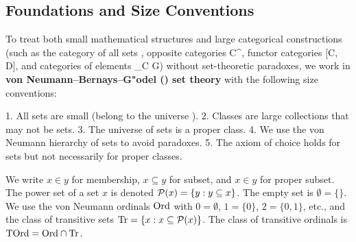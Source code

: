\documentclass[10pt,a4paper]{article}
\begin{document}
\subsection{Foundations and Size Conventions}\label{sec:foundations}
To treat both small mathematical structures and large categorical constructions (such as the category of all sets \Set, opposite categories C^\op, functor categories [C, D], and categories of elements \int_C G) without set-theoretic paradoxes, we work in \textbf{von Neumann--Bernays--G"odel () set theory} with the following size conventions:

1. All sets are small (belong to the universe \Set).
2. Classes are large collections that may not be sets.
3. The universe of sets \Set is a proper class.
4. We use the von Neumann hierarchy of sets to avoid paradoxes.
5. The axiom of choice holds for sets but not necessarily for proper classes.

We write $x \in y$ for membership, $x \subseteq y$ for subset, and $x \in y$ for proper subset. The power set of a set $x$ is denoted ${\mathcal{P}}(x) = \{y: y \subseteq x\}$. The empty set is $\emptyset = \{ \}$. We use the von Neumann ordinals ${\textrm{Ord}}$ with $0 = \emptyset$, $1 = \{0\}$, $2 = \{0,1\}$, etc., and the class of transitive sets ${\textrm{Tr}} = \{x: x \subseteq {\mathcal{P}}(x)\}$. The class of transitive ordinals is ${\textrm{TOrd}} = {\textrm{Ord}} \cap {\textrm{Tr}}$.
\end{document}

